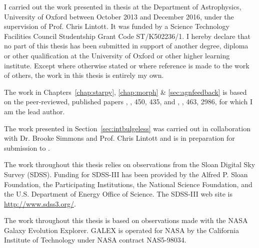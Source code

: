 \documentclass[12pt,useAMS]{ociamthesis}  %
\begin{document}
\begin{originality}
I carried out the work presented in thesis at the Department of Astrophysics, University of Oxford between October 2013 and December 2016, under the supervision of Prof. Chris Lintott. It was funded by a Science Technology Facilities Council Studentship Grant Code ST/K502236/1. I hereby declare that no part of this thesis has been submitted in support of another degree, diploma or other qualification at the University of Oxford or other higher learning institute. Except where otherwise stated or where reference is made to the work of others, the work in this thesis is entirely my own.

The work in Chapters~\ref{chap:starpy}, \ref{chap:morph} \& \ref{sec:agnfeedback} is based on the peer-reviewed, published papers \citealt{smethurst15}, \mnras, 450, 435, and \citealt{smethurst16}, \mnras, 463, 2986, for which I am the lead author. 

The work presented in Section~\ref{sec:intbulgeless} was carried out in collaboration with Dr. Brooke Simmons and Prof. Chris Lintott and is in preparation for submission to \mnras.

The work throughout this thesis relies on observations from the Sloan Digital Sky Survey (SDSS). Funding for SDSS-III has been provided by the Alfred P. Sloan Foundation, the Participating Institutions, the National Science Foundation, and the U.S. Department of Energy Office of Science. The SDSS-III web site is \url{http://www.sdss3.org/}.


The work throughout this thesis is based on observations made with the NASA Galaxy Evolution Explorer. GALEX is operated for NASA by the California Institute of Technology under NASA contract NAS5-98034.


\end{originality}
\end{document}
